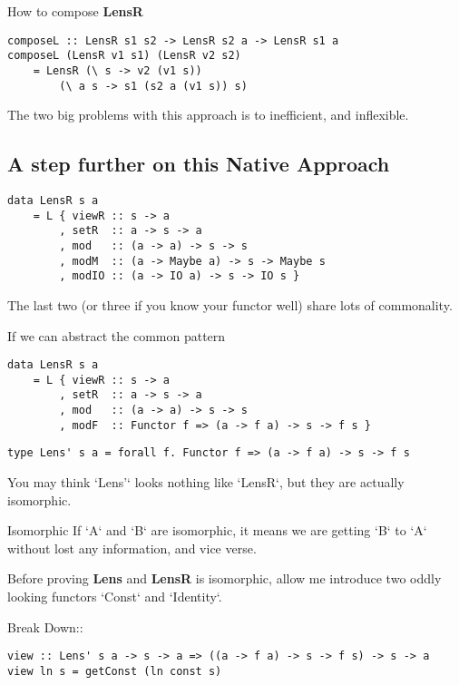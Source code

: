 How to compose \textbf{LensR}

\begin{verbatim}
composeL :: LensR s1 s2 -> LensR s2 a -> LensR s1 a
composeL (LensR v1 s1) (LensR v2 s2)
    = LensR (\ s -> v2 (v1 s))
        (\ a s -> s1 (s2 a (v1 s)) s)
\end{verbatim}

The two big problems with this approach is to inefficient, and inflexible.

\subsection{A step further on this Native Approach}

\begin{verbatim}
data LensR s a
    = L { viewR :: s -> a
        , setR  :: a -> s -> a
        , mod   :: (a -> a) -> s -> s
        , modM  :: (a -> Maybe a) -> s -> Maybe s
        , modIO :: (a -> IO a) -> s -> IO s }
\end{verbatim}

The last two (or three if you know your functor well) share lots of commonality.

If we can abstract the common pattern

\begin{verbatim}
data LensR s a
    = L { viewR :: s -> a
        , setR  :: a -> s -> a
        , mod   :: (a -> a) -> s -> s
        , modF  :: Functor f => (a -> f a) -> s -> f s }
\end{verbatim}



\begin{verbatim}
type Lens' s a = forall f. Functor f => (a -> f a) -> s -> f s
\end{verbatim}

You may think `Lens'` looks nothing like `LensR`, but they are actually isomorphic.


\begin{WrapText}
 Isomorphic
If `A` and `B` are isomorphic, it means we are getting `B` to `A` without lost any information, and vice verse.
\end{WrapText}

Before proving \textbf{Lens} and \textbf{LensR} is isomorphic,
allow me introduce two oddly looking functors `Const` and `Identity`.


Break Down::
\begin{verbatim}
view :: Lens' s a -> s -> a => ((a -> f a) -> s -> f s) -> s -> a
view ln s = getConst (ln const s)
\end{verbatim}

